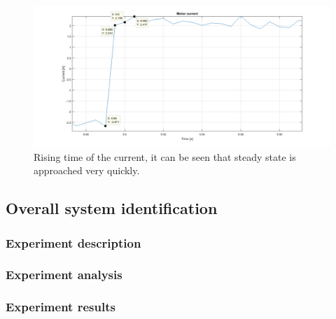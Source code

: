 \begin{figure}[!h]
    \centering
    \includegraphics[width=1\textwidth]{img/motor_id_2.png}
    \caption{Rising time of the current, it can be seen that steady state is approached very quickly.}
    \label{fig:motor_id_2}
\end{figure}

\subsection{Overall system identification}
\subsubsection{Experiment description}
\subsubsection{Experiment analysis}
\subsubsection{Experiment results}